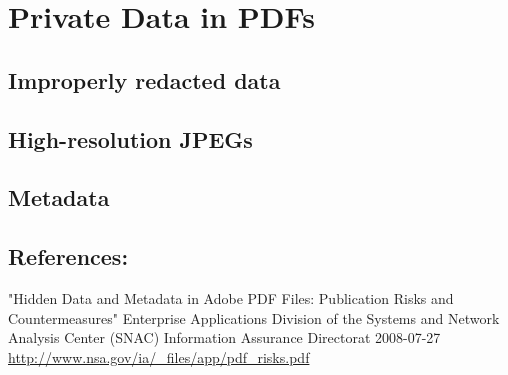 \chapter{Private Data in PDFs}
\section{Improperly redacted data}
\section{High-resolution JPEGs}
\section{Metadata}
\section{ References:}
  "Hidden Data and Metadata in Adobe PDF Files: Publication Risks and Countermeasures"
  Enterprise Applications Division of the Systems and Network Analysis Center (SNAC) Information Assurance Directorat
  2008-07-27
  \url{http://www.nsa.gov/ia/_files/app/pdf_risks.pdf}


